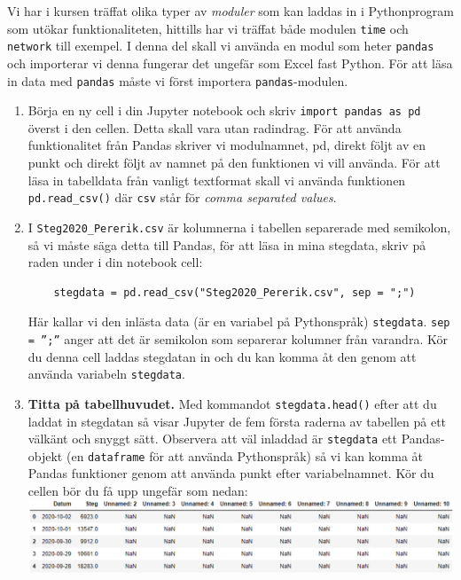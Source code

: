 \documentclass{article}
\begin{document}
Vi har i kursen träffat olika typer av \emph{moduler} som kan laddas in i Pythonprogram som utökar funktionaliteten, hittills har vi träffat både modulen \verb+time+ och \verb+network+ till exempel. I denna del skall vi använda en modul som heter \verb+pandas+ och importerar vi denna fungerar det ungefär som Excel fast Python. För att läsa in data med \verb+pandas+ måste vi först importera \verb+pandas+-modulen. 
\begin{enumerate}
    \item Börja en ny cell i din Jupyter notebook och skriv \texttt{import pandas as pd} överst i den cellen. Detta skall vara utan radindrag. För att använda funktionalitet från Pandas skriver vi modulnamnet, pd, direkt följt av en punkt och direkt följt av namnet på den funktionen vi vill använda. För att läsa in tabelldata från vanligt textformat skall vi använda funktionen \texttt{pd.read_csv()} där \verb+csv+ står för \emph{comma separated values}. 
    \item I \verb+Steg2020_Pererik.csv+ är kolumnerna i tabellen separerade med semikolon, så vi måste säga detta till Pandas, för att läsa in mina stegdata, skriv på raden under i din notebook cell:
  \begin{verbatim}
    stegdata = pd.read_csv("Steg2020_Pererik.csv", sep = ";")
    \end{verbatim}
Här kallar vi den inlästa data (är en variabel på Pythonspråk) \verb+stegdata+. \texttt{sep = ”;”} anger att det är semikolon som separerar kolumner från varandra. Kör du denna cell laddas stegdatan in och du kan komma åt den genom att använda variabeln \verb+stegdata+. 
\item \textbf{Titta på tabellhuvudet.} Med kommandot \texttt{stegdata.head()} efter att du laddat in stegdatan så visar Jupyter de fem första raderna av tabellen på ett välkänt och snyggt sätt. Observera att väl inladdad är \verb+stegdata+ ett Pandas-objekt (en \verb+dataframe+ för att använda Pythonspråk) så vi kan komma åt Pandas funktioner genom att använda punkt efter variabelnamnet. Kör du cellen bör du få upp ungefär som nedan:\\
  \includegraphics[width=\textwidth]{figures/anaconda8.png}\\

\end{enumerate}
\end{document}
